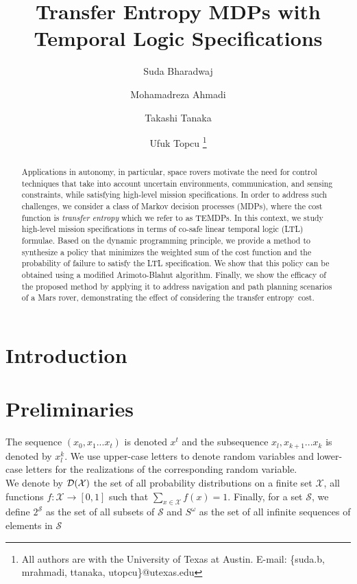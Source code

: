 \documentclass[letterpaper, 10 pt, conference]{ieeeconf}  %
\title{Transfer Entropy MDPs with  Temporal Logic Specifications
}
\author{Suda Bharadwaj \and Mohamadreza Ahmadi \and
 Takashi Tanaka \and Ufuk Topcu%
\thanks{All authors are with the University of Texas at Austin. E-mail: \{suda.b, mrahmadi, ttanaka, utopcu\}@utexas.edu}%
}
\begin{document}
\maketitle
\thispagestyle{empty}
\pagestyle{empty}


\begin{abstract}
Applications in autonomy, in particular, space rovers motivate the need for control techniques that take into account uncertain environments, communication, and sensing constraints, while satisfying high-level mission specifications. In order to address such  challenges, we consider a class of Markov decision processes (MDPs), where the cost function is \emph{transfer entropy} which we refer to as TEMDPs. In this context, we study high-level mission specifications in terms of co-safe linear temporal logic (LTL) formulae.   Based on the dynamic programming principle, we provide a method to synthesize a policy that minimizes the weighted sum of the cost function and the probability of failure to satisfy the LTL specification. We show that this policy can be obtained using a modified Arimoto-Blahut algorithm. Finally, we show the efficacy of the proposed method by applying it to address navigation and path planning scenarios of a Mars rover, demonstrating the effect of considering the transfer entropy~cost.
\end{abstract}


\section{Introduction}


%


\section{Preliminaries}
The sequence $(x_0,x_{1}...x_t)$ is denoted $x^t$ and the subsequence $x_l,x_{k+1}...x_k$ is denoted by $x_{l}^{k}$. We use upper-case letters to denote random variables and lower-case letters for the realizations of the corresponding random variable. \\
We denote by $\mathcal{D}(\mathcal{X})$ the set of all probability distributions on a finite
set $\mathcal{X}$, \ie all functions $f: \mathcal{X} \to [0,1]$ such that $\sum_{x\in \mathcal{X}}f(x)=1$. Finally, for a set $\mathcal{S}$, we define $2^\mathcal{S}$ as the set of all subsets of $\mathcal{S}$ and $S^{\omega}$ as the set of all infinite sequences of elements in $\mathcal{S}$
\end{document}
